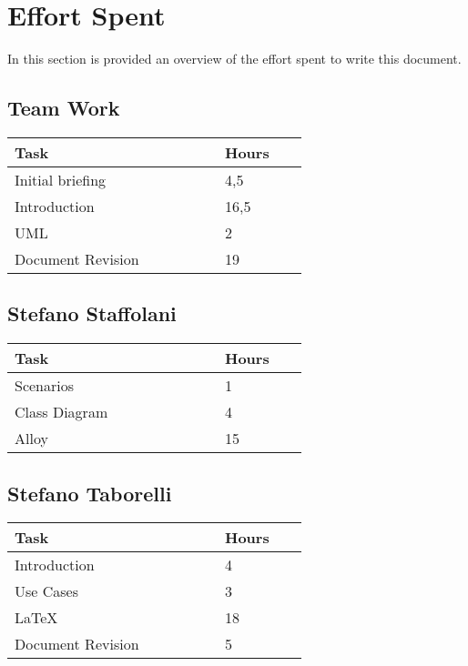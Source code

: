 \section{Effort Spent}
In this section is provided an overview of the effort spent to write this document.
\subsection{Team Work}
\begin{center}
\centering
    \begin{tabular}{@{}p{0.5\linewidth} p{0.2\linewidth}@{}}
        \hline
        \textbf{Task} & \textbf{Hours} \\ \hline
        Initial briefing & 4,5 \\ \hline
        Introduction & 16,5 \\ \hline
        UML & 2\\ \hline
        Document Revision & 19 \\ \hline
    \end{tabular}
\end{center}

\subsection{Stefano Staffolani}
\begin{center}
\centering
    \begin{tabular}{@{}p{0.5\linewidth} p{0.2\linewidth}@{}}
        \hline
        \textbf{Task} & \textbf{Hours} \\ \hline
        Scenarios & 1 \\ \hline
        Class Diagram & 4 \\ \hline
        Alloy & 15\\ \hline
    \end{tabular}
\end{center}

\subsection{Stefano Taborelli}
\begin{center}
\centering
    \begin{tabular}{@{}p{0.5\linewidth} p{0.2\linewidth}@{}}
        \hline
        \textbf{Task} & \textbf{Hours} \\ \hline
        Introduction & 4 \\ \hline
        Use Cases & 3 \\ \hline
        \LaTeX & 18\\ \hline
        Document Revision & 5 \\ \hline
    \end{tabular}
\end{center}

